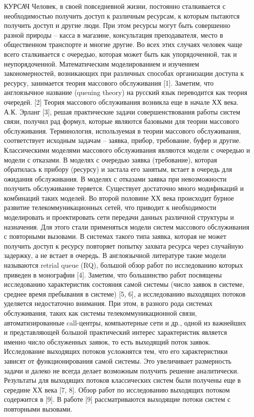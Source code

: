КУРСАЧ
Человек, в своей повседневной жизни, постоянно сталкивается с необходимостью получить доступ к различным ресурсам, к которым пытаются получить доступ и другие люди. При этом ресурсы могут быть совершенно разной природы – касса в магазине, консультация преподавателя, место в общественном транспорте и многие другие. Во всех этих случаях человек чаще всего сталкивается с очередью, которая может быть как упорядоченной, так и неупорядоченной.
Математическим моделированием и изучением закономерностей, возникающих при различных способах организации доступа к ресурсу, занимается теория массового обслуживания [1]. Заметим, что англоязычное название (queuing theory) на русский язык переводится как теория очередей. [2] Теория массового обслуживания возникла еще в начале ХХ века. А.К. Эрланг [3], решая практические задачи совершенствования работы систем связи, получил рад формул, которые являются базовыми для теории массового обслуживания. Терминология, используемая в теории массового обслуживания, соответствует исходным задачам – заявка, прибор, требование, буфер и другие.
Классическими моделями массового обслуживания являются модели с очередью и модели с отказами. В моделях с очередью заявка (требование), которая обратилась к прибору (ресурсу) и застала его занятым, встает в очередь для ожидания обслуживания. В моделях с отказами заявка при невозможности получить обслуживание теряется. Существует достаточно много модификаций и комбинаций таких моделей. 
Во второй половине ХХ века происходит бурное развитие телекоммуникационных сетей, что приводит к необходимости моделировать и проектировать сети передачи данных различной структуры и назначения. Для этого стали применяться модели систем массового обслуживания с повторными вызовами. В системах такого типа заявка, которая не может получить доступ к ресурсу повторяет попытку захвата ресурса через случайную задержку, а не встает в очередь. В англоязычной литературе такие модели называются retrial queue (RQ), большой обзор работ по исследованию которых приведен в монографии [4].
Заметим, что большинство работ посвящены исследованию характеристик состояния самой системы (число заявок в системе, среднее время пребывания в системе) [5, 6], а исследованию выходящих потоков уделяется недостаточно внимания. При этом, в разного рода системах обслуживания, таких как системы телекоммуникационной связи, автоматизированные call-центры, компьютерные сети и др., одной из важнейших и представляющей большой практический интерес характеристик является именно число обслуженных заявок, то есть выходящий поток заявок.
Исследование выходящих потоков усложнятся тем, что его характеристики зависят от функционирования самой системы. Это увеличивает размерность задачи и далеко не всегда делает возможным получить решение аналитически. Результаты для выходящих потоков классических систем были получены еще в середине ХХ века [7, 8]. Обзор работ по исследованию выходящих потоком содержится в [9]. В работе [9] рассматриваются выходящие потоки систем с повторными вызовами.
